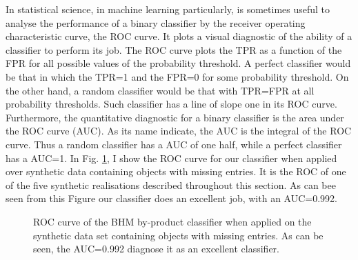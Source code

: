In statistical science,  in machine learning particularly, is sometimes useful to analyse the performance of a binary classifier by the receiver operating characteristic curve, the ROC curve. It plots a visual diagnostic of the ability of a classifier to perform its job. The ROC curve plots the TPR as a function of the FPR for all possible values of the probability threshold. A perfect classifier would be that in which the TPR=1 and the FPR=0 for some probability threshold. On the other hand, a random classifier would be that with TPR=FPR at all probability thresholds. Such classifier has a line of slope one in its ROC curve. Furthermore, the quantitative diagnostic for a binary classifier is the area under the ROC curve (AUC). As its name indicate, the AUC is the integral of the ROC curve. Thus a random classifier has a AUC of one half, while a perfect classifier has a AUC=1. In Fig. \ref{fig:ROC}, I show the ROC curve for our classifier when applied over synthetic data containing objects with missing entries. It is the ROC of one of the five synthetic realisations described throughout this section. As can bee seen from this Figure our classifier does an excellent job, with an AUC=0.992.

\begin{figure}[!htp]
\begin{center}
\caption{ROC curve of the BHM by-product classifier when applied on the synthetic data set containing objects with missing entries. As can be seen, the AUC=0.992 diagnose it as an excellent classifier.}
\label{fig:ROC}
\end{center}
\end{figure}

